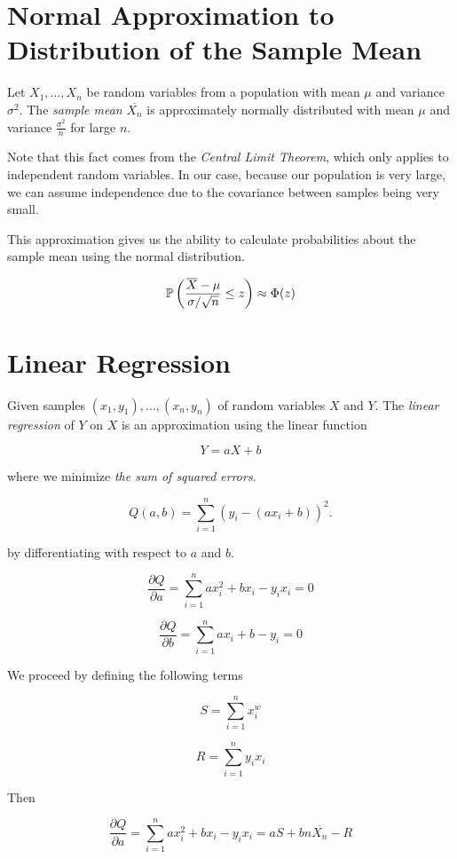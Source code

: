 \QED 

\section{Normal Approximation to Distribution of the Sample Mean}

Let \(X_1, \ldots, X_n\) be random variables from a population with mean \(\mu\) and variance \(\sigma^2\). The 
\emph{sample mean} \(\overline{X_n}\) is approximately normally distributed with mean \(\mu\) and variance \(\frac{\sigma^2}{n}\) for large \(n\).

Note that this fact comes from the \emph{Central Limit Theorem}, which only applies to independent random variables. In our case, 
because our population is very large, we can assume independence due to the covariance between samples being very small.

This approximation gives us the ability to calculate probabilities about the sample mean using the normal distribution. 

\[
    \mathbb{P}\left(\frac{\overline{X} - \mu}{\sigma / \sqrt{n}} \le z\right) \approx \Phi(z)
\]

\section{Linear Regression}

Given samples \((x_{1}, y_{1}), \ldots, (x_{n}, y_{n})\) of random variables \(X\) and \(Y\). The \emph{linear regression} of \(Y\) on \(X\) is an approximation 
using the linear function 

\[
    Y = aX + b 
\]

where we minimize \emph{the sum of squared errors}.

\[
    Q (a, b) = \sum_{i = 1}^{n}(y_i - (a x_i + b))^2.
\]

by differentiating with respect to \(a\) and \(b\).

\[
    \frac{\partial Q}{\partial a}  = \sum_{i = 1}^{n} ax_i^2 + b x_i - y_i x_i = 0
\]

\[
    \frac{\partial Q}{\partial b}  = \sum_{i = 1}^{n} a x_i + b - y_i = 0
\]

We proceed by defining the following terms 

\[
    S = \sum_{i = 1}^{n} x_i^w
\]

\[
    R = \sum_{i = 1}^{n} y_i x_i
\]

Then 

\[
    \frac{\partial Q}{\partial a}  = \sum_{i = 1}^{n} ax_i^2 + b x_i - y_i x_i = aS +bn\overline{X_n} - R
\]

